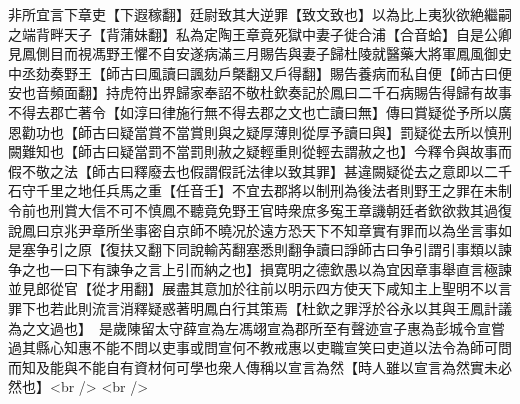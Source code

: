 非所宜言下章吏【下遐稼翻】廷尉致其大逆罪【致文致也】以為比上夷狄欲絶繼嗣之端背畔天子【背蒲妹翻】私為定陶王章竟死獄中妻子徙合浦【合音蛤】自是公卿見鳳側目而視馮野王懼不自安遂病滿三月賜告與妻子歸杜陵就醫藥大將軍鳳風御史中丞劾奏野王【師古曰風讀曰諷劾戶槩翻又戶得翻】賜告養病而私自便【師古曰便安也音頻面翻】持虎符出界歸家奉詔不敬杜欽奏記於鳳曰二千石病賜告得歸有故事不得去郡亡著令【如淳曰律施行無不得去郡之文也亡讀曰無】傳曰賞疑從予所以廣恩勸功也【師古曰疑當賞不當賞則與之疑厚薄則從厚予讀曰與】罰疑從去所以慎刑闕難知也【師古曰疑當罰不當罰則赦之疑輕重則從輕去謂赦之也】今釋令與故事而假不敬之法【師古曰釋廢去也假謂假託法律以致其罪】甚違闕疑從去之意即以二千石守千里之地任兵馬之重【任音壬】不宜去郡將以制刑為後法者則野王之罪在未制令前也刑賞大信不可不慎鳳不聽竟免野王官時衆庶多寃王章譏朝廷者欽欲救其過復說鳳曰京兆尹章所坐事密自京師不曉况於遠方恐天下不知章實有罪而以為坐言事如是塞争引之原【復扶又翻下同說輸芮翻塞悉則翻争讀曰諍師古曰争引謂引事類以諫争之也一曰下有諫争之言上引而納之也】損寛明之德欽愚以為宜因章事舉直言極諫並見郎從官【從才用翻】展盡其意加於往前以明示四方使天下咸知主上聖明不以言罪下也若此則流言消釋疑惑著明鳳白行其策焉【杜欽之罪浮於谷永以其與王鳳計議為之文過也】　是歲陳留太守薛宣為左馮翊宣為郡所至有聲迹宣子惠為彭城令宣嘗過其縣心知惠不能不問以吏事或問宣何不教戒惠以吏職宣笑曰吏道以法令為師可問而知及能與不能自有資材何可學也衆人傳稱以宣言為然【時人雖以宣言為然實未必然也】<br />
<br />

